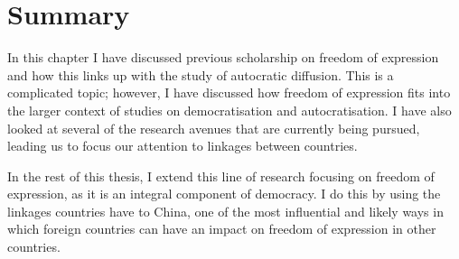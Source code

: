 \section{Summary}
In this chapter I have discussed previous scholarship on freedom of expression and how this links up with the study of autocratic diffusion. This is a complicated topic; however, I have discussed how freedom of expression fits into the larger context of studies on democratisation and autocratisation. I have also looked at several of the research avenues that are currently being pursued, leading us to focus our attention to linkages between countries. 

In the rest of this thesis, I extend this line of research focusing on freedom of expression, as it is an integral component of democracy. I do this by using the linkages countries have to China, one of the most influential and likely ways in which foreign countries can have an impact on freedom of expression in other countries.